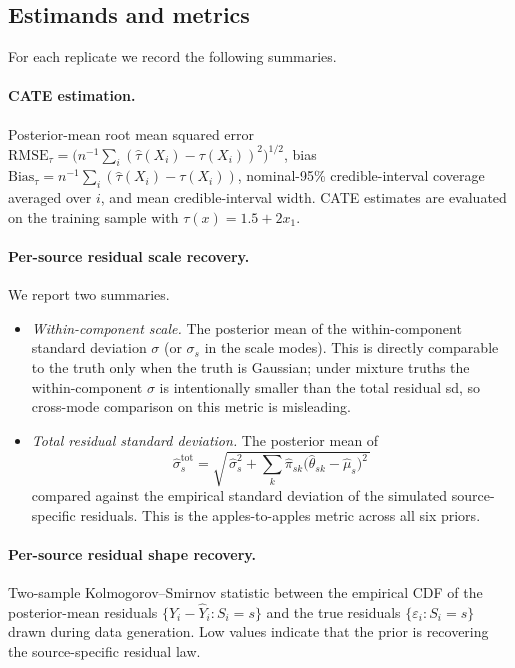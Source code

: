 \documentclass[11pt]{article}
\theoremstyle{plain}
\theoremstyle{definition}
\theoremstyle{remark}
\newcommand{\1}{\mathds{1}}
\begin{document}
\subsection{Estimands and metrics}
\label{sec:sim-metrics}

For each replicate we record the following summaries.

\paragraph{CATE estimation.}
Posterior-mean root mean squared error
$\mathrm{RMSE}_\tau = \big( n^{-1} \sum_i (\hat\tau(X_i) - \tau(X_i))^2 \big)^{1/2}$,
bias $\mathrm{Bias}_\tau = n^{-1} \sum_i (\hat\tau(X_i) - \tau(X_i))$,
nominal-95\% credible-interval coverage averaged over $i$, and mean
credible-interval width. CATE estimates are evaluated on the training
sample with $\tau(x) = 1.5 + 2 x_1$.

\paragraph{Per-source residual scale recovery.}
We report two summaries.
\begin{itemize}
  \item \emph{Within-component scale.} The posterior mean of the
    within-component standard deviation $\sigma$ (or $\sigma_s$ in the
    scale modes). This is directly comparable to the truth only when
    the truth is Gaussian; under mixture truths the within-component
    $\sigma$ is intentionally smaller than the total residual sd, so
    cross-mode comparison on this metric is misleading.
  \item \emph{Total residual standard deviation.} The posterior mean of
    \[
      \hat\sigma^{\text{tot}}_s
      = \sqrt{\,\hat\sigma_s^2 + \textstyle\sum_k \hat\pi_{sk}\bigl(\hat\theta_{sk} - \hat\mu_s\bigr)^2\,}
    \]
    compared against the empirical standard deviation of the
    simulated source-specific residuals. This is the apples-to-apples
    metric across all six priors.
\end{itemize}

\paragraph{Per-source residual shape recovery.}
Two-sample Kolmogorov--Smirnov statistic between the empirical CDF of
the posterior-mean residuals $\{Y_i - \hat Y_i : S_i = s\}$ and the
true residuals $\{\varepsilon_i : S_i = s\}$ drawn during data
generation. Low values indicate that the prior is recovering the
source-specific residual law.
\end{document}
